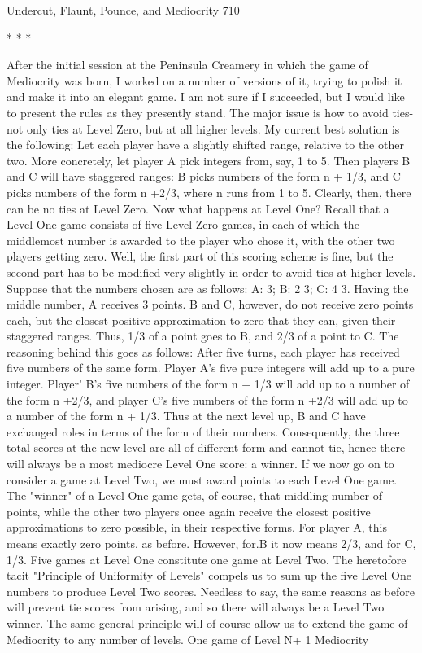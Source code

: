 Undercut, Flaunt, Pounce, and Mediocrity                                               710

                                        *   * *

        After the initial session at the Peninsula Creamery in which the game of
Mediocrity was born, I worked on a number of versions of it, trying to polish it and
make it into an elegant game. I am not sure if I succeeded, but I would like to present
the rules as they presently stand.
        The major issue is how to avoid ties-not only ties at Level Zero, but at all
higher levels. My current best solution is the following: Let each player have a
slightly shifted range, relative to the other two. More concretely, let player A pick
integers from, say, 1 to 5. Then players B and C will have staggered ranges: B picks
numbers of the form n + 1/3, and C picks numbers of the form n +2/3, where n runs
from 1 to 5. Clearly, then, there can be no ties at Level Zero.
        Now what happens at Level One? Recall that a Level One game consists of
five Level Zero games, in each of which the middlemost number is awarded to the
player who chose it, with the other two players getting zero. Well, the first part of this
scoring scheme is fine, but the second part has to be modified very slightly in order to
avoid ties at higher levels. Suppose that the numbers chosen are as follows: A: 3; B: 2
3; C: 4 3. Having the middle number, A receives 3 points. B and C, however, do not
receive zero points each, but the closest positive approximation to zero that they can,
given their staggered ranges. Thus, 1/3 of a point goes to B, and 2/3 of a point to C.
        The reasoning behind this goes as follows: After five turns, each player has
received five numbers of the same form. Player A's five pure integers will add up to a
pure integer. Player' B's five numbers of the form n + 1/3 will add up to a number of
the form n +2/3, and player C's five numbers of the form n +2/3 will add up to a
number of the form n + 1/3. Thus at the next level up, B and C have exchanged roles
in terms of the form of their numbers. Consequently, the three total scores at the new
level are all of different form and cannot tie, hence there will always be a most
mediocre Level One score: a winner.
        If we now go on to consider a game at Level Two, we must award points to
each Level One game. The "winner" of a Level One game gets, of course, that
middling number of points, while the other two players once again receive the closest
positive approximations to zero possible, in their respective forms. For player A, this
means exactly zero points, as before. However, for.B it now means 2/3, and for C,
1/3. Five games at Level One constitute one game at Level Two. The heretofore tacit
"Principle of Uniformity of Levels" compels us to sum up the five Level One numbers
to produce Level Two scores. Needless to say, the same reasons as before will prevent
tie scores from arising, and so there will always be a Level Two winner.
        The same general principle will of course allow us to extend the game of
Mediocrity to any number of levels. One game of Level N+ 1 Mediocrity




